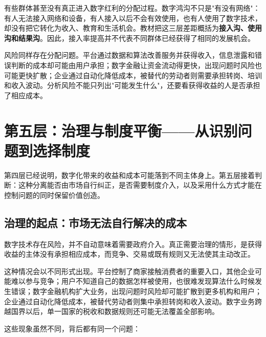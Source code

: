 有些群体甚至没有真正进入数字红利的分配过程。数字鸿沟不只是"有没有网络"：有人无法接入网络和设备，有人接入以后不会有效使用，也有人使用了数字技术，却没有把它转化为收入、教育和生活机会。教材把这三层差距概括为\textbf{接入沟、使用沟和结果沟}。因此，接入率提高并不代表不同群体已经获得了相同的发展机会。

风险同样存在分配问题。平台通过数据和算法改善服务并获得收入，信息泄露和错误判断的成本却可能由用户承担；数字金融让资金流动得更快，出现问题时风险也可能更快扩散；企业通过自动化降低成本，被替代的劳动者则需要承担转岗、培训和收入波动。分析风险不能只列出"可能发生什么"，还要看获得收益的人是否承担了相应成本。

\section[第五层：治理与制度平衡]{第五层：治理与制度平衡——从识别问题到选择制度}

第四层已经说明，数字化带来的收益和成本可能落到不同主体身上。第五层接着判断：这种分离能否由市场自行纠正，是否需要制度介入，以及采用什么方式才能在控制问题的同时保留价值创造。

\begin{center}
\end{center}

\subsection{治理的起点：市场无法自行解决的成本}

数字技术存在风险，并不自动意味着需要政府介入。真正需要治理的情形，是获得收益的主体没有承担相应成本，而竞争、交易或既有规则又无法使其主动改正。

这种情况会以不同形式出现。平台控制了商家接触消费者的重要入口，其他企业可能难以参与竞争；用户不知道自己的数据怎样被使用，也很难发现算法什么时候发生错误；数字金融机构扩大业务，出现问题时风险却可能扩散到更多机构和用户；企业通过自动化降低成本，被替代劳动者则集中承担转岗和收入波动。数字业务跨越国界以后，单一国家的税收和数据规则还可能无法覆盖全部影响。

这些现象虽然不同，背后都有同一个问题：

\begin{center}
\end{center}

